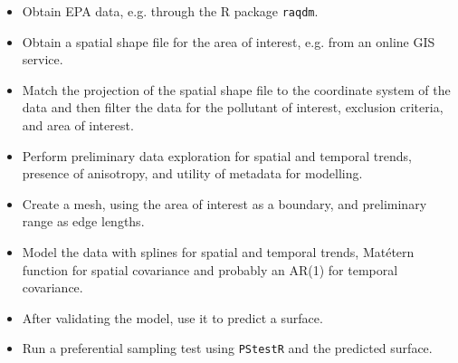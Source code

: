 \documentclass{article}
\begin{document}
\begin{itemize}
\item Obtain \ac{EPA} data, e.g. through the R package \texttt{raqdm}.
\item Obtain a spatial shape file for the area of interest, e.g. from an online GIS service.
\item Match the projection of the spatial shape file to the coordinate system of the data and then filter the data for the pollutant of interest, exclusion criteria, and area of interest.
\item Perform preliminary data exploration for spatial and temporal trends, presence of anisotropy, and utility of metadata for modelling. 
\item Create a mesh, using the area of interest as a boundary, and preliminary range as edge lengths.
\item Model the data with splines for spatial and temporal trends, Mat\'{e}tern function for spatial covariance and probably an AR(1) for temporal covariance.  
\item After validating the model, use it to predict a surface.
\item Run a preferential sampling test using \texttt{PStestR} and the predicted surface.
\end{itemize}





%
\end{document}
